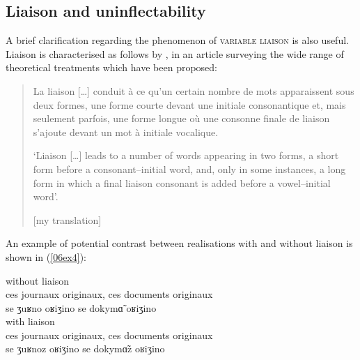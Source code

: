 \documentclass[output=paper,colorlinks,citecolor=brown]{langscibook}
\begin{document}
\subsection{Liaison and uninflectability} \label{06sec3.5}

A brief clarification regarding the phenomenon of \textsc{variable liaison} is also useful. Liaison is characterised as follows by \citet{durandlakscalderonetchobanov2011}, in an article surveying the wide range of theoretical treatments which have been proposed:

\begin{quote}
	La liaison [\ldots] conduit à ce qu'un certain nombre de mots apparaissent sous deux formes, une forme courte devant une initiale consonantique et, mais seulement parfois, une forme longue où une consonne finale de liaison s'ajoute devant un mot à initiale vocalique.
	
	\hfill \citep[105--106]{durandlakscalderonetchobanov2011}
	
	`Liaison [\ldots] leads to a number of words appearing in two forms, a short form before a consonant--initial word, and, only in some instances, a long form in which a final liaison consonant is added before a vowel--initial word'.
	
	\hfill [my translation]
\end{quote}

An example of potential contrast between realisations with and without liaison is shown in (\ref{06ex4}):

\begin{exe}
	\ex \label{06ex4}
	\begin{xlist}
		\ex without liaison \\
		\gll ces journaux originaux, ces documents originaux \\
		se ʒuʁno oʁiʒino se dokymɑ̃ oʁiʒino \\
		
		\ex with liaison \\
		\gll ces journaux originaux, ces documents originaux \\
		se ʒuʁnoz oʁiʒino se dokymɑ̃z oʁiʒino \\
	\end{xlist}
\end{exe}
\end{document}
